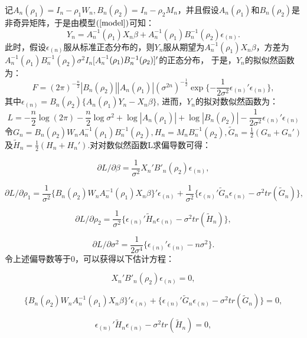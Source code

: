 \documentclass[onecolumn]{ctexart}	%
\begin{document}
记$A_n(\rho_1)=I_n-\rho_1W_n,B_n(\rho_2)=I_n-\rho_2M_n$，并且假设$A_n(\rho_1)$和$B_n(\rho_2)$是非奇异矩阵，于是由模型$\rm(\ref{model}) $可知：
\[
Y_{n} =A_n^{-1}(\rho_1)X_n\beta+A_n^{-1}(\rho_1)B_n^{-1}(\rho_2)\epsilon_{(n)}. 
\]
此时，假设$\epsilon_{(n)}$服从标准正态分布的，则$Y_{n}$服从期望为$A_n^{-1}(\rho_1)X_n\beta$，方差为$A_n^{-1}(\rho_1)B_n^{-1}(\rho_2)\sigma^2 I_n[A_n^{-1}$$\\(\rho_1)B_n^{-1}(\rho_2)]'$的正态分布，
于是，$Y_{n}$的拟似然函数为：
\[
F =(2\pi)^{-\frac{n}{2}}|B_n(\rho_2)||A_n(\rho_1)|(\sigma^{2n})^{-\frac{1}{2}}\exp\{-\frac{1}{2\sigma^{2}}\epsilon_{(n)}'\epsilon_{(n)}\},
\]
其中$\epsilon_{(n)}=B_n(\rho_2)\{A_n(\rho_1)Y_{n}-X_n\beta  \}$,
进而，$Y_{n}$的拟对数似然函数为：
\[
L =-\frac{n}{2}\log(2\pi) -\frac{n}{2}\log\sigma^{2}+\log|A_n(\rho_1)|+\log|B_n(\rho_2)|-\frac{1}{2\sigma^{2}}\epsilon_{(n)}'\epsilon_{(n)}
\]
令$G_n=B_n (\rho_2 ) W_n A_n^{-1} (\rho_1 ) B_n^{-1} (\rho_2 ),H_n=M_n B_n^{-1} (\rho_2),\tilde{G}_n=\frac{1}{2} (G_n+G_n' )$及$\tilde{H}_n=\frac{1}{2} (H_n+H_n' )$.对对数似然函数L求偏导数可得：

\[ \partial L/\partial \beta = \frac{1}{\sigma^{2}}X_n'B'_n(\rho_2)\epsilon_{(n)}, \]

\[ \partial L/\partial \rho_1 = \frac{1}{\sigma^{2}}\{B_n (\rho_2 )W_nA_n^{-1} (\rho_1 )X_n\beta  \}'\epsilon_{(n)}+\frac{1}{\sigma^{2}}\{\epsilon_{(n)}'\tilde{G}_n\epsilon_{(n)} -\sigma^{2}tr(\tilde{G}_n)\}, \]

\[ \partial L/\partial \rho_2 = \frac{1}{\sigma^{2}}\{\epsilon_{(n)}'\tilde{H}_n\epsilon_{(n)} -\sigma^{2}tr(\tilde{H}_n)\}, \]

\[ \partial L/\partial \sigma^{2} = \frac{1}{2\sigma^{4}}\{\epsilon_{(n)}'\epsilon_{(n)} -n\sigma^{2}\}. \]
令上述偏导数等于0，可以获得以下估计方程：


\begin{equation}
    X_n'B'_n(\rho_2)\epsilon_{(n)} =0,\label{2}
\end{equation}

\begin{equation}
    \{B_n (\rho_2 )W_nA_n^{-1} (\rho_1 )X_n\beta  \}'\epsilon_{(n)}+\{\epsilon_{(n)}'\tilde{G}_n\epsilon_{(n)} -\sigma^{2}tr(\tilde{G}_n)\}=0,\label{3}
\end{equation}

\begin{equation}
    \epsilon_{(n)}'\tilde{H}_n\epsilon_{(n)} -\sigma^{2}tr(\tilde{H}_n)=0, \label{4}
\end{equation}    
    
\end{document}
